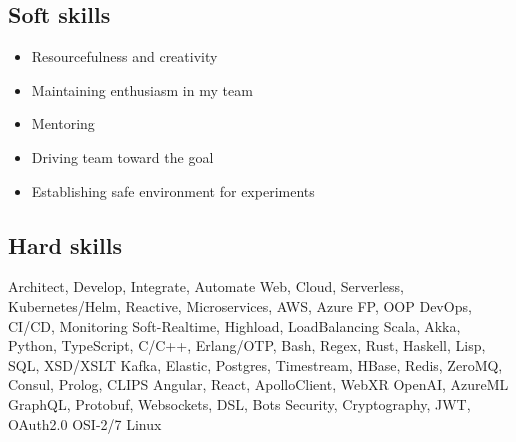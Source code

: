 
\subsection*{Soft skills}

\begin{itemize}[noitemsep, nosep]
  \item Resourcefulness and creativity
  \item Maintaining enthusiasm in my team
  \item Mentoring
  \item Driving team toward the goal
  \item Establishing safe environment for experiments
\end{itemize}

\subsection*{Hard skills}

Architect, Develop, Integrate, Automate \textbar{}
Web, Cloud, Serverless, Kubernetes/Helm, Reactive, Microservices, AWS, Azure \textbar{}
FP, OOP \textbar{}
DevOps, CI/CD, Monitoring \textbar{}
Soft-Realtime, Highload, LoadBalancing \textbar{}
Scala, Akka, Python, TypeScript, C/C++, Erlang/OTP, Bash, Regex, Rust, Haskell, Lisp, SQL, XSD/XSLT \textbar{}
Kafka, Elastic, Postgres, Timestream, HBase, Redis, ZeroMQ, Consul, Prolog, CLIPS \textbar{}
Angular, React, ApolloClient, WebXR \textbar{}
OpenAI, AzureML \textbar{} GraphQL, Protobuf, Websockets, DSL, Bots \textbar{}
Security, Cryptography, JWT, OAuth2.0 \textbar{}
OSI-2/7 \textbar{}
Linux
